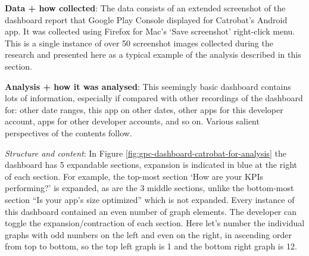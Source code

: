 \textbf{Data + how collected}: The data consists of an extended screenshot of the dashboard report that Google Play Console displayed for Catrobat's  Android app. It was collected using Firefox for Mac's `Save screenshot' right-click menu. This is a single instance of over 50 screenshot images collected during the research and presented here as a typical example of the analysis described in this section.

\textbf{Analysis + how it was analysed}: This seemingly basic dashboard contains lots of information, especially if compared with other recordings of the dashboard for: other date ranges, this app on other dates, other apps for this developer account, apps for other developer accounts, and so on. Various salient perspectives of the contents follow.

\textit{Structure and content}: 
In Figure \ref{fig:gpc-dashboard-catrobat-for-analysis} the dashboard has 5 expandable sections, expansion is indicated in blue at the right of each section. For example, the top-most section `How are your KPIs performing?' is expanded, as are the 3 middle sections, unlike the bottom-most section ``Is your app's size optimized'' which is not expanded. Every instance of this dashboard contained an even number of graph elements. The developer can toggle the expansion/contraction of each section. Here let's number the individual graphs with odd numbers on the left and even on the right, in ascending order from top to bottom, so the top left graph is 1 and the bottom right graph is 12.

